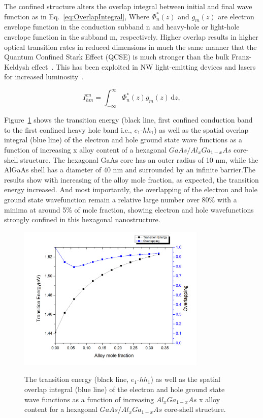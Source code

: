 The confined structure alters the overlap integral between initial and final
wave function as in Eq.~\ref{eq:OverlapIntegral}, Where ${\Phi_n^\ast}(z)$ and
$g_m(z)$ are electron envelope function in the conduction subband n and
heavy-hole or light-hole envelope function in the subband m, respectively.
Higher overlap results in higher optical transition rates in reduced dimensions
in much the same manner that the Quantum Confined Stark Effect (QCSE) is much
stronger than the bulk Franz-Keldysh effect~\cite{schmitt1987theory}. This has
been exploited in NW light-emitting devices and lasers for increased
luminosity~\cite{Tan:2015fa}.

\begin{equation}
{I_{hm}^{en}}=\int_{-\infty}^\infty{\Phi_n^\ast}(z){g_m(z)}\,\mathrm{d}z,
\label{eq:OverlapIntegral}
\end{equation}

Figure~\ref{AlloySweepMatrixElements} shows the transition energy (black line,
first confined conduction band to the first confined heavy hole band i.e.,
$e_1$-$hh_1$) as well as the spatial overlap integral (blue line) of the
electron and hole ground state wave functions as a function of increasing x
alloy content of a hexagonal $GaAs/Al_xGa_{1-x}As$ core-shell structure. The
hexagonal GaAs core has an outer radius of 10 nm, while the AlGaAs shell has a
diameter of 40 nm and surrounded by an infinite barrier.The results show with
increasing of the alloy mole fraction, as expected, the transition energy
increased. And most importantly, the overlapping of the electron and hole
ground state wavefunction remain a relative large number over 80\% with a
minima at around 5\% of mole fraction, showing electron and hole wavefunctions
strongly confined in this hexagonal nanostructure.

\begin{figure}
  \caption{The transition energy (black line, $e_1$-$hh_1$) as well as the spatial overlap integral (blue line) of the electron and hole ground state wave functions as a function of increasing $Al_xGa_{1-x}As$ x alloy content for a hexagonal $GaAs/Al_xGa_{1-x}As$ core-shell structure.}
  \centering
  \includegraphics[width=0.8\textwidth]{pictures/RM/AlloySweepMatrixElements}
  \label{AlloySweepMatrixElements}
\end{figure}

